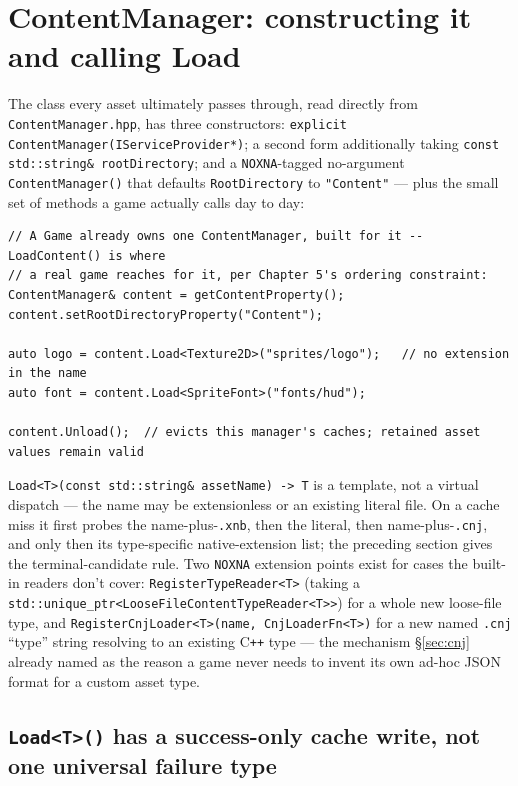 \section{ContentManager: constructing it and calling Load}

The class every asset ultimately passes through, read directly from
\texttt{ContentManager.hpp}, has three constructors: \texttt{explicit
ContentManager(IServiceProvider*)}; a second form additionally taking
\texttt{const std::string\& rootDirectory}; and a \texttt{NOXNA}-tagged no-argument
\texttt{ContentManager()} that defaults \texttt{RootDirectory} to \texttt{"Content"} --- plus
the small set of methods a game actually calls day to day:

\begin{lstlisting}
// A Game already owns one ContentManager, built for it -- LoadContent() is where
// a real game reaches for it, per Chapter 5's ordering constraint:
ContentManager& content = getContentProperty();
content.setRootDirectoryProperty("Content");

auto logo = content.Load<Texture2D>("sprites/logo");   // no extension in the name
auto font = content.Load<SpriteFont>("fonts/hud");

content.Unload();  // evicts this manager's caches; retained asset values remain valid
\end{lstlisting}

\texttt{Load<T>(const std::string\& assetName) -> T} is a template, not a virtual dispatch ---
the name may be extensionless or an existing literal file. On a cache miss it first probes the
name-plus-\texttt{.xnb}, then the literal, then name-plus-\texttt{.cnj}, and only then its
type-specific native-extension list; the preceding section gives the terminal-candidate rule.
Two
\texttt{NOXNA} extension points exist for cases the built-in readers don't cover:
\texttt{RegisterTypeReader<T>} (taking a
\texttt{std::unique\_ptr<LooseFileContentTypeReader<T>>}) for a whole new
loose-file type, and \texttt{RegisterCnjLoader<T>(name, CnjLoaderFn<T>)} for a new named
\texttt{.cnj} ``type'' string resolving to an existing C\texttt{++} type --- the mechanism
\S\ref{sec:cnj} already named as the reason a game never needs to invent its own ad-hoc JSON
format for a custom asset type.

\subsection{\texttt{Load<T>()} has a success-only cache write, not one universal failure type}

